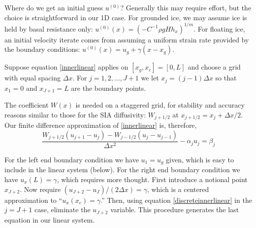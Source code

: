 \documentclass[letterpaper,final,12pt,reqno]{amsart}
\begin{document}
Where do we get an initial guess $u^{(0)}$?  Generally this may require effort, but the choice is straightforward in our 1D case.  For grounded ice, we may assume ice is held by basal resistance only: $u^{(0)}(x) = \left(-C^{-1} \rho g H h_x\right)^{1/m}$.  For floating ice, an initial velocity iterate comes from assuming a uniform strain rate provided by the boundary conditions: $u^{(0)}(x) = u_g + \gamma (x-x_g)$.

Suppose equation \eqref{innerlinear} applies on $[x_g,x_c]=[0,L]$ and choose a grid with equal spacing $\Delta x$.  For $j=1,2,\dots,J+1$ we let $x_j=(j-1)\Delta x$ so that $x_1 = 0$ and $x_{J+1} = L$ are the boundary points.

The coefficient $W(x)$ is needed on a staggered grid, for stability and accuracy reasons similar to those for the SIA diffusivity: $W_{j+1/2}$ at $x_{j+1/2} = x_j + \Delta x/2$.  Our finite difference approximation of \eqref{innerlinear} is, therefore,
\begin{equation}
  \frac{W_{j+1/2} (u_{j+1} - u_j) - W_{j-1/2} (u_{j} - u_{j-1})}{\Delta x^2} - \alpha_j u_j = \beta_j  \label{discreteinnerlinear}
\end{equation}

For the left end boundary condition we have $u_1 = u_g$ given, which is easy to include in the linear system (below).  For the right end boundary condition we have $u_x(L)=\gamma$, which requires more thought.  First introduce a notional point $x_{J+2}$.  Now require $(u_{J+2} - u_J)/(2 \Delta x) = \gamma$, which is a centered approximation to ``$u_x(x_c)=\gamma$.''  Then, using equation \eqref{discreteinnerlinear} in the $j=J+1$ case, eliminate the $u_{J+2}$ variable.  This procedure generates the last equation in our linear system.
\end{document}

